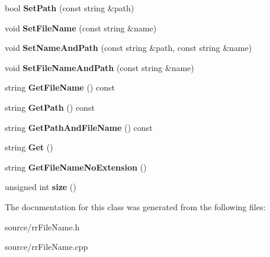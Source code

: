 \begin{DoxyCompactItemize}
\item 
\hypertarget{classrr_1_1_file_name_a72c0a1c11c41edf983bf39f61ef66666}{bool {\bfseries Set\-Path} (const string \&path)}\label{classrr_1_1_file_name_a72c0a1c11c41edf983bf39f61ef66666}

\item 
\hypertarget{classrr_1_1_file_name_ad02fac05925efcfcc92b2c541e85a6a4}{void {\bfseries Set\-File\-Name} (const string \&name)}\label{classrr_1_1_file_name_ad02fac05925efcfcc92b2c541e85a6a4}

\item 
\hypertarget{classrr_1_1_file_name_aea7e965efaf3f55d6d13c25c670a09e1}{void {\bfseries Set\-Name\-And\-Path} (const string \&path, const string \&name)}\label{classrr_1_1_file_name_aea7e965efaf3f55d6d13c25c670a09e1}

\item 
\hypertarget{classrr_1_1_file_name_abc5b9c4c9fc32fee24cf625c96bc1594}{void {\bfseries Set\-File\-Name\-And\-Path} (const string \&name)}\label{classrr_1_1_file_name_abc5b9c4c9fc32fee24cf625c96bc1594}

\item 
\hypertarget{classrr_1_1_file_name_a0400ce802a2c298779d1c7eea332a473}{string {\bfseries Get\-File\-Name} () const }\label{classrr_1_1_file_name_a0400ce802a2c298779d1c7eea332a473}

\item 
\hypertarget{classrr_1_1_file_name_a00ed6f90ade9b91c16d0707156adb5aa}{string {\bfseries Get\-Path} () const }\label{classrr_1_1_file_name_a00ed6f90ade9b91c16d0707156adb5aa}

\item 
\hypertarget{classrr_1_1_file_name_a93cdc75c11bce6065d340818add12d1c}{string {\bfseries Get\-Path\-And\-File\-Name} () const }\label{classrr_1_1_file_name_a93cdc75c11bce6065d340818add12d1c}

\item 
\hypertarget{classrr_1_1_file_name_adbff312b405b9b4f44f906f970cbbb0c}{string {\bfseries Get} ()}\label{classrr_1_1_file_name_adbff312b405b9b4f44f906f970cbbb0c}

\item 
\hypertarget{classrr_1_1_file_name_a6d5e9af39b8043e5ce859a2a8e8bd0e8}{string {\bfseries Get\-File\-Name\-No\-Extension} ()}\label{classrr_1_1_file_name_a6d5e9af39b8043e5ce859a2a8e8bd0e8}

\item 
\hypertarget{classrr_1_1_file_name_a1213dd29f6a20d82949098ef3a0ee2f2}{unsigned int {\bfseries size} ()}\label{classrr_1_1_file_name_a1213dd29f6a20d82949098ef3a0ee2f2}

\end{DoxyCompactItemize}


The documentation for this class was generated from the following files\-:\begin{DoxyCompactItemize}
\item 
source/rr\-File\-Name.\-h\item 
source/rr\-File\-Name.\-cpp\end{DoxyCompactItemize}
